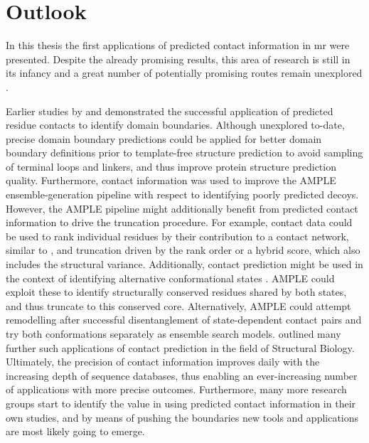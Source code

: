 \section{Outlook}
In this thesis the first applications of predicted contact information in \gls{mr} were presented. Despite the already promising results, this area of research is still in its infancy and a great number of potentially promising routes remain unexplored \cite{Simkovic2017-xs}. 

Earlier studies by \textcite{Rigden2002-mf} and \textcite{Sadowski2013-zu} demonstrated the successful application of predicted residue contacts to identify domain boundaries. Although unexplored to-date, precise domain boundary predictions could be applied for better domain boundary definitions prior to template-free structure prediction to avoid sampling of terminal loops and linkers, and thus improve protein structure prediction quality. Furthermore, contact information was used to improve the AMPLE ensemble-generation pipeline with respect to identifying poorly predicted decoys. However, the AMPLE pipeline might additionally benefit from predicted contact information to drive the truncation procedure. For example, contact data could be used to rank individual residues by their contribution to a contact network, similar to \textcite{Parente2015-mv}, and truncation driven by the rank order or a hybrid score, which also includes the structural variance. Additionally, contact prediction might be used in the context of identifying alternative conformational states \cite{Hopf2012-zl,Jana2014-rw,Sfriso2016-ml,Morcos2013-ks,Sutto2015-ck}. AMPLE could exploit these to identify structurally conserved residues shared by both states, and thus truncate to this conserved core. Alternatively, AMPLE could attempt remodelling after successful disentanglement of state-dependent contact pairs and try both conformations separately as ensemble search models. \textcite{Simkovic2017-xs} outlined many further such applications of contact prediction in the field of Structural Biology. Ultimately, the precision of contact information improves daily with the increasing depth of sequence databases, thus enabling an ever-increasing number of applications with more precise outcomes. Furthermore, many more research groups start to identify the value in using predicted contact information in their own studies, and by means of pushing the boundaries new tools and applications are most likely going to emerge. 

